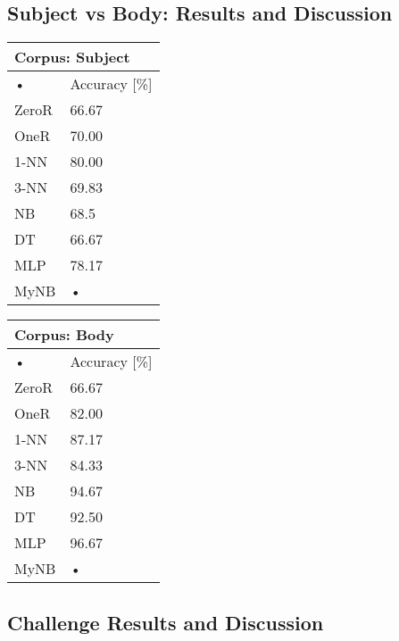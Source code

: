 \documentclass[10pt, a4paper]{article}
\begin{document}
\subsection*{Subject vs Body: Results and Discussion}

\begin{tabular}{|l|l|}
\hline 
\multicolumn{2}{|l|}{Corpus: Subject} \\ 
\hline 
• & Accuracy [\%] \\ 
\hline 
ZeroR & 66.67 \\ 
\hline 
OneR & 70.00 \\ 
\hline 
1-NN & 80.00 \\ 
\hline 
3-NN & 69.83 \\ 
\hline 
NB & 68.5 \\ 
\hline 
DT & 66.67 \\ 
\hline 
MLP & 78.17 \\ 
\hline 
MyNB & • \\ 
\hline 
\end{tabular} 

\begin{tabular}{|l|l|}
\hline 
\multicolumn{2}{|l|}{Corpus: Body} \\ 
\hline 
• & Accuracy [\%] \\ 
\hline 
ZeroR & 66.67 \\ 
\hline 
OneR & 82.00 \\ 
\hline 
1-NN & 87.17 \\ 
\hline 
3-NN & 84.33 \\ 
\hline 
NB & 94.67 \\ 
\hline 
DT & 92.50 \\ 
\hline 
MLP & 96.67 \\ 
\hline 
MyNB & • \\ 
\hline 
\end{tabular} 


\subsection*{Challenge Results and Discussion}
\end{document}
